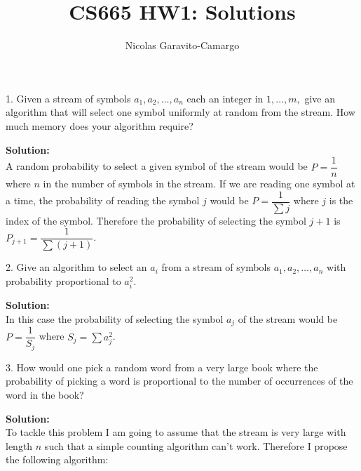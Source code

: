\documentclass[14pt]{article}
\title{CS665 HW1: Solutions}
\author{Nicolas Garavito-Camargo}
\begin{document}
\maketitle

\begin{mdframed}

1. Given a stream of symbols $a_1,a_2,…,a_n$ each an integer in
$1,…,m,$ give an algorithm that will select one symbol uniformly
 at random from the stream. How much memory does your algorithm require?

\end{mdframed}

\textbf{Solution:}\\

A random probability to select a given symbol of the stream
would be $P = \dfrac{1}{n}$ where $n$ in the number of symbols in the
stream. If we are reading one symbol at a time, the probability of
reading the symbol $j$ would
be $P = \dfrac{1}{\sum j}$ where $j$ is the index of the symbol. Therefore 
the probability of selecting the symbol $j+1$ is $P_{j+1} =
\dfrac{1}{\sum (j+1)}$.\\


\begin{mdframed}
2. Give an algorithm to select an $a_i$ from a stream of symbols
$a_1,a_2,…,a_n$ with probability proportional to $a^2_i$.\\
\end{mdframed}

\textbf{Solution:}\\


In this case the probability of selecting the symbol $a_j$ of the stream 
would be $P = \dfrac{1}{S_{j}}$ where $S_j = \sum a_j^2$.

\begin{mdframed}
3. How would one pick a random word from a very large book where the
probability of picking a word is proportional to the number of
occurrences of the word in the book? \\
\end{mdframed}

\textbf{Solution:}\\

To tackle this problem I am going to assume that the stream is very
large with length $n$ such that a simple counting algorithm can't
work. Therefore I propose the following algorithm:
\end{document}
